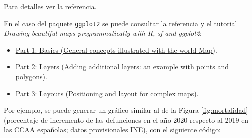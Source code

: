 \documentclass[
  spanish,
]{book}
\providecommand{\tightlist}{%
  \setlength{\itemsep}{0pt}\setlength{\parskip}{0pt}}
\theoremstyle{break}
\begin{document}
Para detalles ver la \href{https://r-spatial.github.io/sf/reference/tidyverse.html}{referencia}.

En el caso del paquete \href{https://ggplot2.tidyverse.org}{\texttt{ggplot2}} se puede consultar la \href{https://ggplot2.tidyverse.org/reference/ggsf.html}{referencia} y el tutorial \emph{Drawing beautiful maps programmatically with R, sf and ggplot2}:

\begin{itemize}
\tightlist
\item
  \href{https://r-spatial.org/r/2018/10/25/ggplot2-sf.html}{Part 1: Basics (General concepts illustrated with the world Map)}.
\item
  \href{https://r-spatial.org/r/2018/10/25/ggplot2-sf-2.html}{Part 2: Layers (Adding additional layers: an example with points and polygons)}.
\item
  \href{https://r-spatial.org/r/2018/10/25/ggplot2-sf-3.html}{Part 3: Layouts (Positioning and layout for complex maps)}.
\end{itemize}

Por ejemplo, se puede generar un gráfico similar al de la Figura \ref{fig:mortalidad} (porcentaje de incremento de las defunciones en el año 2020 respecto al 2019 en las CCAA españolas; datos provisionales \href{https://www.ine.es/jaxi/Tabla.htm?tpx=21856\&L=0}{INE}), con el siguiente código:
\end{document}
